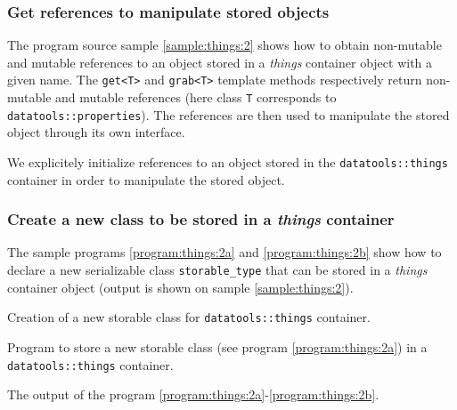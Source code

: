 \subsubsection{Get references to manipulate stored objects}

\pn  The  program source  sample  \ref{sample:things:2}  shows how  to
obtain non-mutable  and mutable  references to an  object stored  in a
\emph{things} container object with a given name.  The \texttt{get<T>}
and \texttt{grab<T>} template  methods respectively return non-mutable
and   mutable  references  (here   class  \texttt{T}   corresponds  to
\texttt{datatools::properties}).   The  references  are then  used  to
manipulate the stored object through its own interface.

\begin{sample}[h]
\caption{We explicitely  initialize references to an  object stored in
  the \texttt{datatools::things} container  in order to manipulate the
  stored object.  }
\label{sample:things:2}
\end{sample}

\subsubsection{Create a new class to be stored in a \emph{things} container}

\pn     The     sample     programs    \ref{program:things:2a}     and
\ref{program:things:2b}  show how to  declare a new  serializable class
\texttt{storable\_type}  that   can  be  stored   in  a  \emph{things}
container object (output is shown on sample \ref{sample:things:2}).

\begin{program}[h]
\caption{Creation of a new storable class for
  \texttt{datatools::things} container.
}
\label{program:things:2a}
\end{program}

\begin{program}[h]
\caption{Program  to   store  a   new  storable  class   (see  program
  \ref{program:things:2a})   in   a  \texttt{datatools::things}
  container.  }
\label{program:things:2b}
\end{program}


\begin{sample}[h]
\caption{The          output          of          the          program
  \ref{program:things:2a}-\ref{program:things:2b}.  }
\label{sample:things:2}
\end{sample}

